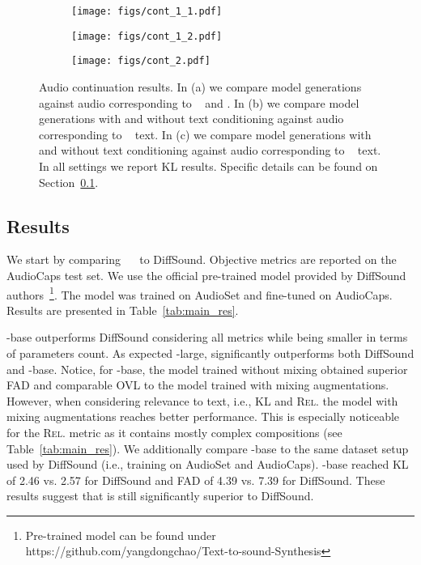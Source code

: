 \begin{figure}[t!]
\centering
\begin{subfigure}{0.32\textwidth}
    \centering
    \texttt{[image: figs/cont\_1\_1.pdf]}
    \caption{\label{fig:first}}
\end{subfigure}
\begin{subfigure}{0.32\textwidth}
    \centering
    \texttt{[image: figs/cont\_1\_2.pdf]}
    \caption{\label{fig:mid}}
\end{subfigure}
\begin{subfigure}{0.32\textwidth}
    \centering
    \texttt{[image: figs/cont\_2.pdf]}
    \caption{\label{fig:second}}
\end{subfigure}
\caption{\label{fig:audio_cont} Audio continuation results. In (a) we compare model generations against audio corresponding to \src~ and \rnd. In (b) we compare model generations with and without text conditioning against audio corresponding to \rnd~ text. In (c) we compare model generations with and without text conditioning against audio corresponding to \src~ text. In all settings we report KL results. Specific details can be found on Section~\ref{sec:res}.}
\end{figure}

\subsection{Results}
\label{sec:res}

We start by comparing \audiogen~~ to DiffSound. Objective metrics are reported on the AudioCaps test set. We use the official pre-trained model provided by DiffSound authors~\footnote{Pre-trained model can be found under https://github.com/yangdongchao/Text-to-sound-Synthesis}. The model was trained on AudioSet and fine-tuned on AudioCaps.
Results are presented in Table~\ref{tab:main_res}. 

\audiogen-base outperforms DiffSound considering all metrics while being smaller in terms of parameters count. As expected \audiogen-large, significantly outperforms both DiffSound and \audiogen-base. Notice, for \audiogen-base, the model trained without mixing obtained superior \ac{FAD} and comparable OVL to the model trained with mixing augmentations. However, when considering relevance to text, i.e., KL and \textsc{Rel.} the model with mixing augmentations reaches better performance. This is especially noticeable for the \textsc{Rel.} metric as it contains mostly complex compositions (see Table~\ref{tab:main_res}). We additionally compare \audiogen-base to the same dataset setup used by DiffSound (i.e., training on AudioSet and AudioCaps). \audiogen-base reached KL of 2.46 vs. 2.57 for DiffSound and FAD of 4.39 vs. 7.39 for DiffSound. These results suggest that \audiogen is still significantly superior to DiffSound.

